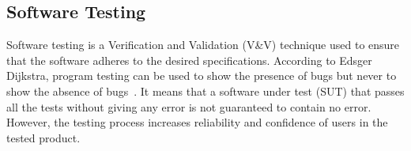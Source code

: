 

\subsection{Software Testing} 
Software testing is a Verification and Validation (V\&V) technique used to ensure that the software adheres to the desired specifications. According to Edsger Dijkstra, program testing can be used to show the presence of bugs but never to show the absence of bugs~\cite{dahl1972structured}. It means that a software under test (SUT) that passes all the tests without giving any error is not guaranteed to contain no error. However, the testing process increases reliability and confidence of users in the tested product.

